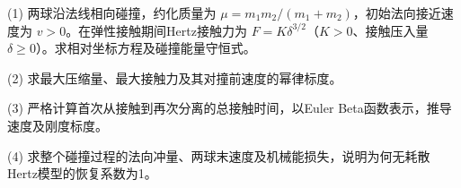 (1) 两球沿法线相向碰撞，约化质量为 \(\mu=m_1m_2/(m_1+m_2)\)，初始法向接近速度为 \(v>0\)。在弹性接触期间Hertz接触力为 \(F=K\delta^{3/2}\)（\(K>0\)、接触压入量 \(\delta\ge0\)）。求相对坐标方程及碰撞能量守恒式。

(2) 求最大压缩量、最大接触力及其对撞前速度的幂律标度。

(3) 严格计算首次从接触到再次分离的总接触时间，以Euler Beta函数表示，推导速度及刚度标度。

(4) 求整个碰撞过程的法向冲量、两球末速度及机械能损失，说明为何无耗散Hertz模型的恢复系数为1。
